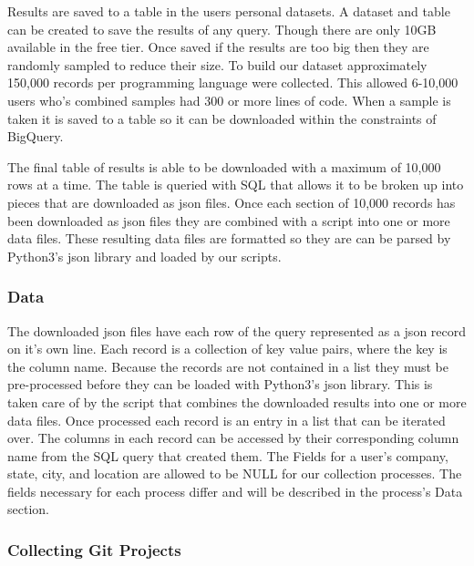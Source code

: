 \documentclass{article}
\begin{document}
Results are saved to a table in the users personal datasets. A dataset and table can be created to save the results of any query. Though there are only 10GB available in the free tier. Once saved if the results are too big then they are randomly sampled to reduce their size. To build our dataset approximately 150,000 records per programming language were collected. This allowed 6-10,000 users who's combined samples had 300 or more lines of code. When a sample is taken it is saved to a table so it can be downloaded within the constraints of BigQuery.

The final table of results is able to be downloaded with a maximum of 10,000 rows at a time. The table is queried with SQL that allows it to be broken up into pieces that are downloaded as json files. Once each section of 10,000 records has been downloaded as json files they are combined with a script into one or more data files. These resulting data files are formatted so they are can be parsed by Python3's json library and loaded by our scripts.

\subsubsection*{Data}
The downloaded json files have each row of the query represented as a json record on it's own line. Each record is a collection of key value pairs, where the key is the column name. Because the records are not contained in a list they must be pre-processed before they can be loaded with Python3's json library. This is taken care of by the script that combines the downloaded results into one or more data files. Once processed each record is an entry in a list that can be iterated over. The columns in each record can be accessed by their corresponding column name from the SQL query that created them. The Fields for a user's company, state, city, and location are allowed to be NULL for our collection processes. The fields necessary for each process differ and will be described in the process's Data section.

\subsubsection{Collecting Git Projects}
\end{document}
